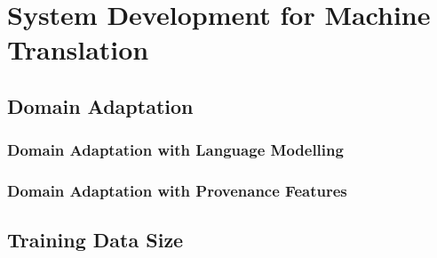 \chapter{System Development for Machine Translation}


\section{Domain Adaptation}

\subsection{Domain Adaptation with Language Modelling}


\subsection{Domain Adaptation with Provenance Features}


\section{Training Data Size}

